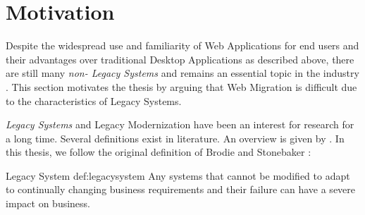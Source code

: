 \vspace{-15pt}
\hypertarget{motivation}{%
\section{Motivation}\label{motivation}}
\vspace{15pt}

Despite the widespread use and familiarity of \glspl{Web Application} for end users and their advantages over traditional \glspl{Desktop Application} as described above, there are still many \emph{non- \glspl{Legacy System}} and  remains an essential topic in the industry \autocite{Batlajery2014IndustrialSurveyModernization,Khadka2014ProfessionalsModernization,Gartner2013CIOAgenda,Gartner2013Priorities,NASCIO2016,ForresterResearch2011Modernization}.
This section motivates the thesis by arguing that \gls{Web Migration} is difficult due to the characteristics of \glspl{Legacy System}.

\emph{\glspl{Legacy System}} and \gls{Legacy Modernization} have been an interest for research for a long time.
Several definitions exist in literature.
An overview is given by \citet{Wagner2014}.
In this thesis, we follow the original definition of Brodie and Stonebaker \autocite{Brodie1995Migrating}:

\vspace{-15pt}
\begin{thesisdefinition}{Legacy System \autocite{Brodie1995Migrating}}{def:legacysystem}
Any systems that cannot be modified to adapt to continually changing business requirements and their failure can have a severe impact on business.
\end{thesisdefinition}

